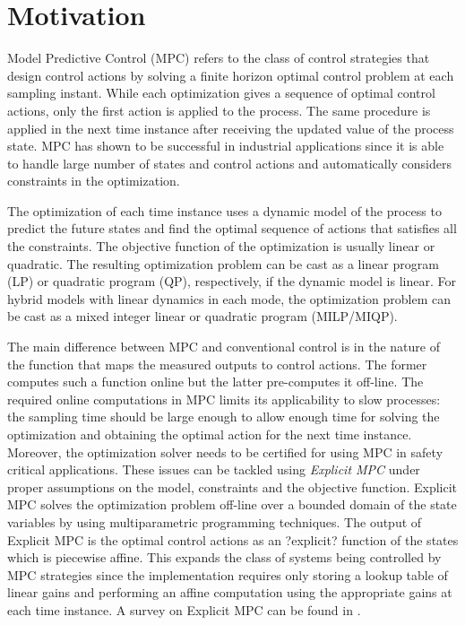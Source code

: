 \section{Motivation}

Model Predictive Control (MPC) refers to the class of control strategies that design control actions by solving a finite horizon optimal control problem at each sampling instant. While each optimization gives a sequence of optimal control actions, only the first action is applied to the process. The same procedure is applied in the next time instance after receiving the updated value of the process state. MPC has shown to be successful in industrial applications since it is able to handle large number of states and control actions and automatically considers constraints in the optimization.

The optimization of each time instance uses a dynamic model of the process to predict the future states and find the optimal sequence of actions that satisfies all the constraints. The objective function of the optimization is usually linear or quadratic. The resulting optimization problem can be cast as a linear program (LP) or quadratic program (QP), respectively, if the dynamic model is linear. For hybrid models with linear dynamics in each mode, the optimization problem can be cast as a mixed integer linear or quadratic program (MILP/MIQP). 

 The main difference between MPC and conventional control is in the nature of the function that maps the measured outputs to control actions. The former computes such a function online but the latter pre-computes it off-line. The required online computations in MPC limits its applicability to slow processes: the sampling time should be large enough to allow enough time for solving the optimization and obtaining the optimal action for the next time instance. Moreover, the optimization solver needs to be certified for using MPC in safety critical applications.
These issues can be tackled using \emph{Explicit MPC} under proper assumptions on the model, constraints and the objective function. Explicit MPC solves the optimization problem off-line over a bounded domain of the state variables by using multiparametric programming techniques. The output of Explicit MPC is the optimal control actions as an ?explicit? function of the states which is piecewise affine. This expands the class of systems being controlled by MPC strategies since the implementation requires only storing a lookup table of linear gains and performing an affine computation using the appropriate gains at each time instance. A survey on Explicit MPC can be found in \cite{Alessio2009}.

